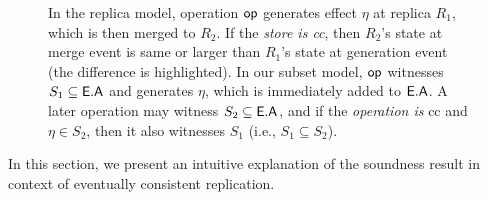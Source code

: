 \begin{figure}
{}
\hspace*{0.1in}
 \caption{In the replica model, operation $\textsf{op}$ generates effect
$\eta$ at replica $R_1$, which is then merged to $R_2$. If the
\emph{store is {\sc cc}}, then $R_2$'s state at merge event is same or
larger than $R_1$'s state at generation event (the difference is
highlighted). In our subset model, $\textsf{op}$ witnesses $S_1 \subseteq
\textsf{E}.\textsf{A}$ and generates $\eta$, which is immediately added to $\textsf{E}.\textsf{A}$. A
later operation may witness $S_2 \subseteq \textsf{E}.\textsf{A}$, and if the
\emph{operation is} {\sc cc} and $\eta \in S_2$, then it also
witnesses $S_1$ (i.e., $S_1 \subseteq S_2$). } 
\label{fig:ec-theirs-vs-ours}
\end{figure}

In this section, we present an intuitive explanation of the soundness
result in context of eventually consistent replication. 


